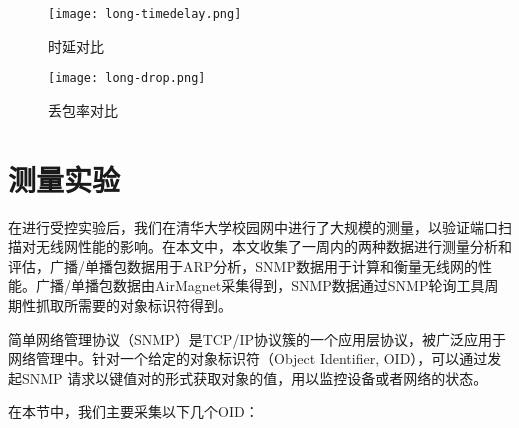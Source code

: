 \begin{figure}
  \centering
  \texttt{[image: long-timedelay.png]}
  \caption{时延对比}
  \label{fig:时延对比}
\end{figure}

\begin{figure}
  \centering
  \texttt{[image: long-drop.png]}
  \caption{丢包率对比}
  \label{fig:丢包率对比}
\end{figure}


\section{测量实验}
在进行受控实验后，我们在清华大学校园网中进行了大规模的测量，以验证端口扫描对无线网性能的影响。在本文中，本文收集了一周内的两种数据进行测量分析和评估，广播/单播包数据用于ARP分析，SNMP数据用于计算和衡量无线网的性能。广播/单播包数据由AirMagnet采集得到，SNMP数据通过SNMP轮询工具周期性抓取所需要的对象标识符得到。



简单网络管理协议（SNMP）是TCP/IP协议簇的一个应用层协议，被广泛应用于网络管理中\cite{perkins1997understanding}。针对一个给定的对象标识符（Object Identifier, OID），可以通过发起SNMP 请求以键值对的形式获取对象的值，用以监控设备或者网络的状态。

在本节中，我们主要采集以下几个OID：

